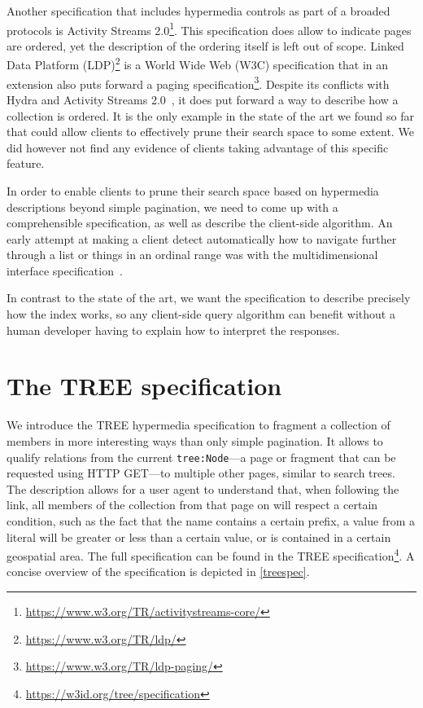 \documentclass[
]{ceurart}
\begin{document}
Another specification that includes hypermedia controls as part of a broaded protocols is Activity Streams 2.0\footnote{\url{https://www.w3.org/TR/activitystreams-core/}}.
This specification does allow to indicate pages are ordered, yet the description of the ordering itself is left out of scope.
Linked Data Platform (LDP)\footnote{\url{https://www.w3.org/TR/ldp/}} is a World Wide Web (W3C) specification that in an extension also puts forward a paging specification\footnote{\url{https://www.w3.org/TR/ldp-paging/}}.
Despite its conflicts with Hydra and Activity Streams 2.0~\cite{mihindukulasooriyadescribing}, it does put forward a way to describe how a collection is ordered.
It is the only example in the state of the art we found so far that could allow clients to effectively prune their search space to some extent. We did however not find any evidence of clients taking advantage of this specific feature.

In order to enable clients to prune their search space based on hypermedia descriptions beyond simple pagination, we need to come up with a comprehensible specification, as well as describe the client-side algorithm.
An early attempt at making a client detect automatically how to navigate further through a list or things in an ordinal range was with the multidimensional interface specification~\cite{mdi}.

In contrast to the state of the art, we want the specification to describe precisely how the index works, so any client-side query algorithm can benefit without a human developer having to explain how to interpret the responses.

\section{The TREE specification}

We introduce the TREE hypermedia specification to fragment a collection of members in more interesting ways than only simple pagination.
It allows to qualify relations from the current \texttt{tree:Node}---a page or fragment that can be requested using HTTP GET---to multiple other pages, similar to search trees. 
The description allows for a user agent to understand that, when following the link, all members of the collection from that page on will respect a certain condition, such as the fact that the name contains a certain prefix, a value from a literal will be greater or less than a certain value, or is contained in a certain geospatial area.
The full specification can be found in the TREE specification\footnote{\url{https://w3id.org/tree/specification}}.
A concise overview of the specification is depicted in \cref{treespec}.
\end{document}
